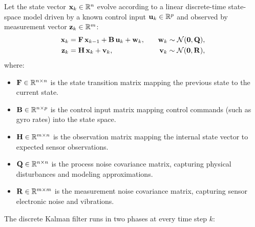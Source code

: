 Let the state vector $\mathbf{x}_k \in \mathbb{R}^n$ evolve according to a linear discrete-time state-space model driven by a known control input $\mathbf{u}_k \in \mathbb{R}^p$ and observed by measurement vector $\mathbf{z}_k \in \mathbb{R}^m$:
\begin{align}
  \mathbf{x}_k &= \mathbf{F}\, \mathbf{x}_{k-1} + \mathbf{B}\, \mathbf{u}_k + \mathbf{w}_k , \quad &\mathbf{w}_k \sim \mathcal{N}(\mathbf{0}, \mathbf{Q}) , \label{ch36:eq-mat-state-model} \\
  \mathbf{z}_k &= \mathbf{H}\, \mathbf{x}_k + \mathbf{v}_k , \quad &\mathbf{v}_k \sim \mathcal{N}(\mathbf{0}, \mathbf{R}) , \label{ch36:eq-mat-obs-model}
\end{align}
where:
\begin{itemize}
  \item $\mathbf{F} \in \mathbb{R}^{n \times n}$ is the state transition matrix mapping the previous state to the current state.
  \item $\mathbf{B} \in \mathbb{R}^{n \times p}$ is the control input matrix mapping control commands (such as gyro rates) into the state space.
  \item $\mathbf{H} \in \mathbb{R}^{m \times n}$ is the observation matrix mapping the internal state vector to expected sensor observations.
  \item $\mathbf{Q} \in \mathbb{R}^{n \times n}$ is the process noise covariance matrix, capturing physical disturbances and modeling approximations.
  \item $\mathbf{R} \in \mathbb{R}^{m \times m}$ is the measurement noise covariance matrix, capturing sensor electronic noise and vibrations.
\end{itemize}

The discrete Kalman filter runs in two phases at every time step $k$:

